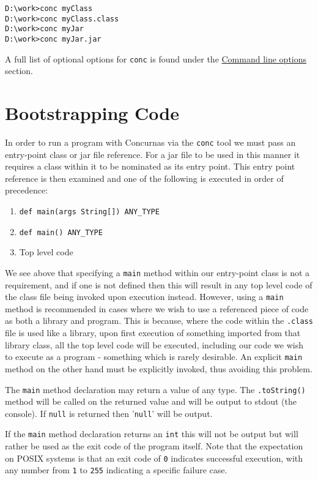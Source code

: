 \documentclass[conc-doc]{subfiles}
\begin{document}
\begin{lstlisting}[language=None]
D:\work>conc myClass
D:\work>conc myClass.class
D:\work>conc myJar
D:\work>conc myJar.jar
\end{lstlisting}


A full list of optional options for \lstinline[language=None]{conc} is found under the \hyperref[sec:cmdlineparams]{Command line options} section.

\section{Bootstrapping Code}
In order to run a program with Concurnas via the \lstinline[language=None]{conc} tool we must pass an entry-point class or jar file reference. For a jar file to be used in this manner it requires a class within it to be nominated as its entry point. This entry point reference is then examined and one of the following is executed in order of precedence:

\begin{enumerate}
	\item \lstinline!def main(args String[]) ANY_TYPE!
	\item \lstinline!def main() ANY_TYPE!
	\item Top level code
\end{enumerate}

We see above that specifying a \lstinline{main} method within our entry-point class is not a requirement, and if one is not defined then this will result in any top level code of the class file being invoked upon execution instead. However, using a \lstinline{main} method is recommended in cases where we wish to use a referenced piece of code as both a library and program. This is because, where the code within the \lstinline{.class} file is used like a library, upon first execution of something imported from that library class, all the top level code will be executed, including our code we wish to execute as a program - something which is rarely desirable. An explicit \lstinline{main} method on the other hand must be explicitly invoked, thus avoiding this problem.

The \lstinline{main} method declaration may return a value of any type. The \lstinline{.toString()} method will be called on the returned value and will be output to stdout (the console). If \lstinline{null} is returned then '\lstinline{null}' will be output.

If the \lstinline{main} method declaration returns an \lstinline{int} this will not be output but will rather be used as the exit code of the program itself. Note that the expectation on POSIX systems is that an exit code of \lstinline{0} indicates successful execution, with any number from \lstinline{1} to \lstinline{255} indicating a specific failure case.
\end{document}
